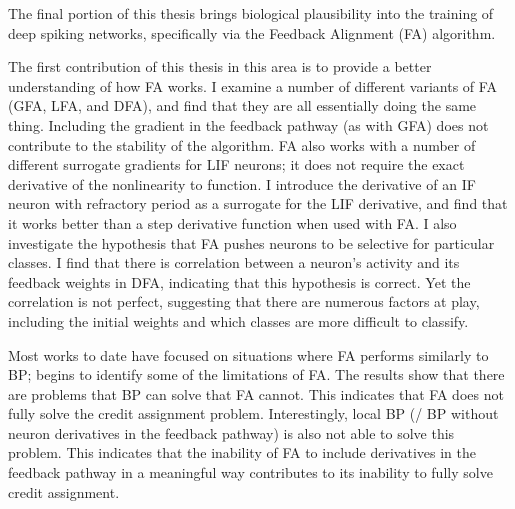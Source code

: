 The final portion of this thesis
brings biological plausibility
into the training of deep spiking networks,
specifically via the Feedback Alignment (FA) algorithm.

The first contribution of this thesis in this area
is to provide a better understanding of how FA works.
I examine a number of different variants of FA (GFA, LFA, and DFA),
and find that they are all essentially doing the same thing.
Including the gradient in the feedback pathway (as with GFA)
does not contribute to the stability of the algorithm.
FA also works with a number of different surrogate gradients for LIF neurons;
it does not require the exact derivative of the nonlinearity to function.
I introduce the derivative of an IF neuron with refractory period
as a surrogate for the LIF derivative,
and find that it works better than a step derivative function
when used with FA.
I also investigate the hypothesis that FA pushes neurons
to be selective for particular classes.
I find that there is correlation between a neuron's activity
and its feedback weights in DFA,
indicating that this hypothesis is correct.
Yet the correlation is not perfect,
suggesting that there are numerous factors at play,
including the initial weights and which classes are more difficult to classify.

Most works to date have focused on situations where FA performs similarly to BP;
 begins to identify some of the limitations of FA.
The results show that there are problems that BP can solve that FA cannot.
This indicates that FA does not fully solve the credit assignment problem.
Interestingly, local BP (\ie/ BP without neuron derivatives in the feedback pathway)
is also not able to solve this problem.
This indicates that the inability of FA
to include derivatives in the feedback pathway in a meaningful way
contributes to its inability to fully solve credit assignment.


